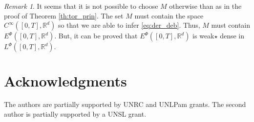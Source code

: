 \documentclass[twoside]{article}
\theoremstyle{remark}
\newtheorem{comentario}{Remark}
\newcommand{\lphi}{L^{\Phi}}
\newcommand{\ephi}{E^{\Phi}}
\newcommand{\rr}{\mathbb{R}}
\begin{document}
\begin{comentario} It seems that it is not possible to choose $M$ otherwise than as in
the proof of Theorem  \ref{th:tor_prin}. The set $M$ must contain the space $C^{\infty} ([0,T],\rr^d)$ 
so that we are able to infer \eqref{eq:der_deb}. Thus, $M$ must contain $\ephi([0,T],\rr^d)$. But, it can be  proved that $\ephi([0,T],\rr^d)$  is weak$\star$ dense in $\lphi([0,T],\rr^d)$.
\end{comentario}

\section*{Acknowledgments}
The authors are partially supported by  UNRC and UNLPam grants. The second author is  partially supported by a  UNSL grant. 




% 
 
 

\end{document}
